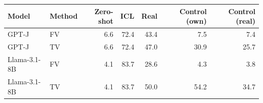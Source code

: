 \begin{tabular}{llrrrrr}
\toprule
Model & Method & Zero-shot & ICL & Real & Control (own) & Control (real) \\
\midrule
GPT-J & FV & 6.6 & 72.4 & 43.4 & 7.5 & 7.4 \\
GPT-J & TV & 6.6 & 72.4 & 47.0 & 30.9 & 25.7 \\
Llama-3.1-8B & FV & 4.1 & 83.7 & 28.6 & 4.3 & 3.8 \\
Llama-3.1-8B & TV & 4.1 & 83.7 & 50.0 & 54.2 & 34.7 \\
\bottomrule
\end{tabular}
